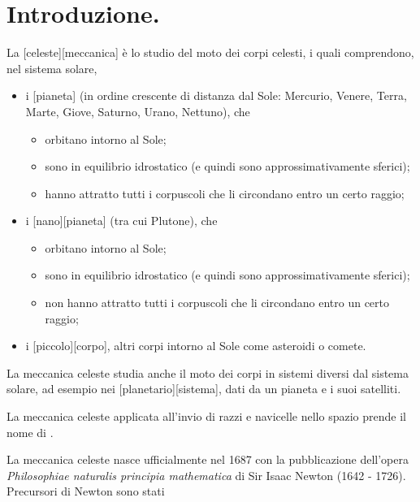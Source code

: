 \section{Introduzione.}
\label{ElementiDiMeccanicaCeleste_CenniDiAstronomia}
\begin{Definition}
	La [celeste][meccanica] \`e lo studio del moto dei corpi celesti, i quali comprendono, nel sistema solare,
	\begin{itemize}
		\item i [pianeta] (in ordine crescente di distanza dal Sole: Mercurio, Venere, Terra, Marte, Giove, Saturno, Urano, Nettuno), che
		\begin{itemize}
			\item orbitano intorno al Sole;
			\item sono in equilibrio idrostatico (e quindi sono approssimativamente sferici);
			\item hanno attratto tutti i corpuscoli che li circondano entro un certo raggio;
		\end{itemize}
		\item i [pianeta] (tra cui Plutone), che
		\begin{itemize}
			\item orbitano intorno al Sole;
			\item sono in equilibrio idrostatico (e quindi sono approssimativamente sferici);
			\item non hanno attratto tutti i corpuscoli che li circondano entro un certo raggio;
		\end{itemize}
		\item i [piccolo][corpo], altri corpi intorno al Sole come asteroidi o comete.
	\end{itemize}
	La meccanica celeste studia anche il moto dei corpi in sistemi diversi dal sistema solare, ad esempio nei [planetario][sistema], dati da un pianeta e i suoi satelliti.
\end{Definition}
\begin{Definition}
	La meccanica celeste applicata all'invio di razzi e navicelle nello spazio prende il nome di .
\end{Definition}
\par La meccanica celeste nasce ufficialmente nel 1687 con la pubblicazione dell'opera \textit{Philosophiae naturalis principia mathematica} di Sir Isaac Newton (1642 - 1726). Precursori di Newton sono stati
